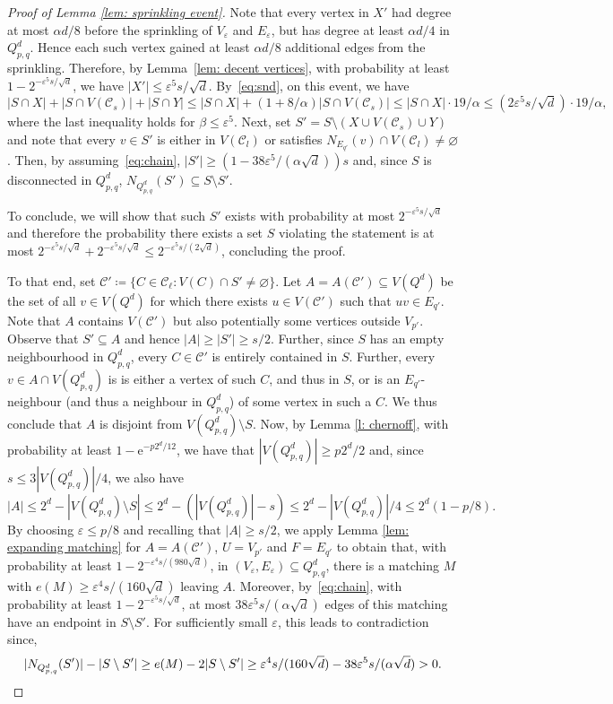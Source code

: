 \documentclass{article}
\theoremstyle{definition}
\newcommand{\eps}{\varepsilon}
\newcommand{\e}{\mathrm{e}}
\newcommand{\cC}{\mathcal{C}}
\begin{document}
\begin{proof}[Proof of Lemma \ref{lem: sprinkling event}]
Note that every vertex in $X'$ had degree at most $\alpha d/8$
before the sprinkling of $V_{\eps}$ and $E_{\eps}$, but has degree
at least $\alpha d/4$ in $Q^d_{p,q}$. Hence each such vertex
gained at least $\alpha d/8$ additional edges from the
sprinkling. Therefore, by Lemma~\ref{lem: decent vertices}, with
probability at least $1-2^{-\eps^5 s/\sqrt{d}}$, we have
$|X'| \le \eps^5 s/\sqrt d$. By~\eqref{eq:snd}, on this event, we have
\begin{equation}\label{eq:chain}
|S\cap X|+|S\cap V(\cC_s)|+|S\cap Y|\le  |S\cap X|+(1+8/\alpha)|S\cap V(\cC_s)| \le |S\cap X| \cdot 19/\alpha
    \le (2\eps^5 s/\sqrt{d})\cdot 19/\alpha,    
\end{equation}
where the last inequality holds for $\beta\le \eps^5$.
Next, set $S'=S\setminus (X\cup V(\cC_s)\cup Y)$ and note that every $v\in S'$ is either in $V(\cC_l)$ or satisfies $N_{E_{q'}}(v)\cap V(\cC_l)\neq\varnothing$. 
Then, by assuming~\eqref{eq:chain},
$|S'|\ge (1-38\eps^5/(\alpha \sqrt{d}))s$ and, since $S$ is disconnected in $Q^d_{p,q}$, $N_{Q^d_{p,q}}(S')\subseteq S\setminus S'$. 

To conclude, we will show that such $S'$ exists with probability at most $2^{-\eps^5 s/\sqrt{d}}$ and therefore the probability there exists a set $S$ violating the statement is at most $2^{-\eps^5 s/\sqrt{d}}+2^{-\eps^5 s/\sqrt{d}}\le 2^{-\eps^5 s/(2\sqrt{d})}$, concluding the proof. 

To that end, set $\cC'\coloneqq \{C\in \cC_{\ell}\colon V(C)\cap S'\neq\varnothing\}$. Let $A=A(\cC')\subseteq V(Q^d)$ be the set of all $v\in V(Q^d)$ for which there exists $u\in V(\cC')$ such that $uv\in E_{q'}$. Note that $A$ contains $V(\cC')$ but also potentially some vertices outside $V_{p'}$.
Observe that $S'\subseteq A$ and hence $|A|\ge |S'|\ge s/2$. 
Further, since $S$ has an empty neighbourhood in $Q^d_{p,q}$, every $C\in \cC'$ is entirely contained in $S$. Further, every $v\in A\cap V(Q^d_{p,q})$ is is either a vertex of such $C$, and thus in $S$, or is an $E_{q'}$-neighbour (and thus a neighbour in $Q^d_{p,q}$) of some vertex in such a $C$. We thus conclude that $A$ is disjoint from $V(Q^d_{p,q})\setminus S$. Now, by Lemma \ref{l: chernoff}, with probability at least $1-\e^{-p2^d/12}$, we have that $|V(Q^d_{p,q})|\ge p2^d/2$ and, since $s\le 3|V(Q^d_{p,q})|/4$, we also have \[|A|\le 2^d-|V(Q^d_{p,q})\setminus S|\le 2^d-(|V(Q^d_{p,q})|-s)\le 2^d-|V(Q^d_{p,q})|/4\le 2^d(1-p/8).\]
By choosing $\eps\le p/8$ and recalling that $|A|\ge s/2$, we apply Lemma \ref{lem: expanding matching} for $A=A(\cC')$, $U=V_{p'}$ and $F=E_{q'}$ to obtain that, with probability at least $1-2^{-\eps^4s/(980\sqrt{d})}$, in $(V_\eps,E_\eps)\subseteq Q^d_{p,q}$, there is a matching $M$ with $e(M)\ge \eps^4s/(160\sqrt{d})$ leaving $A$. 
Moreover, by~\eqref{eq:chain}, with probability at least $1-2^{-\eps^5 s/\sqrt{d}}$, at most $38\eps^5 s/(\alpha\sqrt{d})$ edges of this matching have an endpoint in $S\setminus S'$. For sufficiently small $\eps$, this leads to contradiction since,
\[|N_{Q^d_{p,q}}(S')|-|S\setminus S'|\ge e(M)-2|S\setminus S'|\ge \eps^4s/(160\sqrt{d}) - 38\eps^5s/(\alpha \sqrt{d}) > 0.\qedhere\]
\end{proof}
\end{document}
